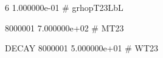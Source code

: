     6 1.000000e-01 # grhopT23LbL 


  8000001 7.000000e+02 # MT23 

DECAY 8000001 5.000000e+01 # WT23 

